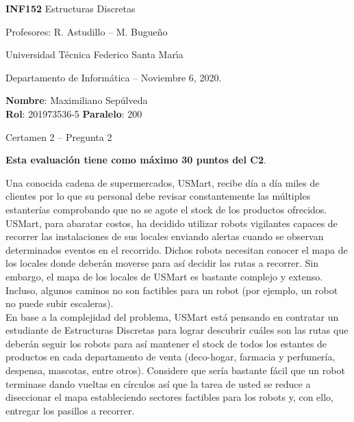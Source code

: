 \documentclass[letterpaper,10pt]{article}
\begin{document}
\thispagestyle{empty}

\begin{minipage}[t]{0.6\textwidth}

{\LARGE \textbf{INF152} Estructuras Discretas}

{\large Profesores: R. Astudillo -- M. Bugueño}

Universidad Técnica Federico Santa Mar\'{\i}a

Departamento de Informática -- Noviembre 6, 2020.

\end{minipage}
\hfill
\begin{minipage}[t]{0.35\textwidth}
\textbf{Nombre}: Maximiliano Sepúlveda\\[0.3cm]
\textbf{Rol}: 201973536-5 \textbf{Paralelo}: 200
\end{minipage}

\vspace{0.8cm}

{\Large Certamen 2 -- Pregunta 2}

\vspace{0.4cm}

\textbf{Esta evaluación tiene como máximo 30 puntos del C2}.

Una conocida cadena de supermercados, USMart, recibe día a día miles de clientes por lo que su personal debe revisar constantemente las múltiples estanterías comprobando que no se agote el stock de los productos ofrecidos. USMart, para abaratar costos, ha decidido utilizar robots vigilantes capaces de recorrer las instalaciones de sus locales enviando alertas cuando se observan determinados eventos en el recorrido. Dichos robots necesitan conocer el mapa de los locales donde deberán moverse para así decidir las rutas a recorrer. Sin embargo, el mapa de los locales de USMart es bastante complejo y extenso. Incluso, algunos caminos no son factibles para un robot (por ejemplo, un robot no puede subir escaleras). \\
En base a la complejidad del problema, USMart está pensando en contratar un estudiante de Estructuras Discretas para lograr descubrir cuáles son las rutas que deberán seguir los robots para así mantener el stock de todos los estantes de productos en cada departamento de venta (deco-hogar, farmacia y perfumería, despensa, mascotas, entre otros). Considere que sería bastante fácil que un robot terminase dando vueltas en círculos así que la tarea de usted se reduce a diseccionar el mapa estableciendo sectores factibles para los robots y, con ello, entregar los pasillos a recorrer.
\end{document}
